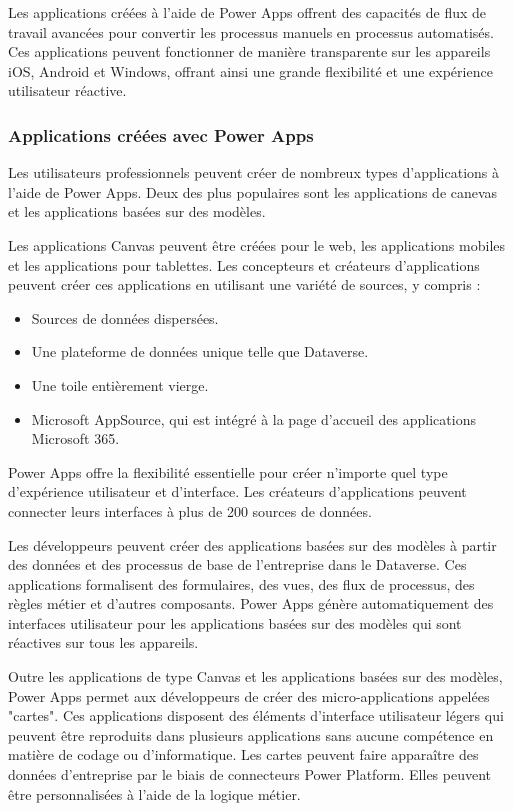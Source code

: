 \documentclass[a4paper, oneside, 12pt, final]{extreport}
\begin{document}
Les applications créées à l'aide de Power Apps offrent des capacités de flux de travail avancées pour convertir les processus manuels en processus automatisés. Ces applications peuvent fonctionner de manière transparente sur les appareils iOS, Android et Windows, offrant ainsi une grande flexibilité et une expérience utilisateur réactive.


\subsubsection{Applications créées avec Power Apps}
Les utilisateurs professionnels peuvent créer de nombreux types d'applications à l'aide de Power Apps. Deux des plus populaires sont les applications de canevas et les applications basées sur des modèles.

Les applications Canvas peuvent être créées pour le web, les applications mobiles et les applications pour tablettes. Les concepteurs et créateurs d'applications peuvent créer ces applications en utilisant une variété de sources, y compris :
\begin{itemize}
\item Sources de données dispersées.
\item Une plateforme de données unique telle que Dataverse.
\item Une toile entièrement vierge.
\item Microsoft AppSource, qui est intégré à la page d'accueil des applications Microsoft 365.
\end{itemize}

Power Apps offre la flexibilité essentielle pour créer n'importe quel type d'expérience utilisateur et d'interface. Les créateurs d'applications peuvent connecter leurs interfaces à plus de 200 sources de données.

Les développeurs peuvent créer des applications basées sur des modèles à partir des données et des processus de base de l'entreprise dans le Dataverse. Ces applications formalisent des formulaires, des vues, des flux de processus, des règles métier et d'autres composants. Power Apps génère automatiquement des interfaces utilisateur pour les applications basées sur des modèles qui sont réactives sur tous les appareils.

Outre les applications de type Canvas et les applications basées sur des modèles, Power Apps permet aux développeurs de créer des micro-applications appelées "cartes". Ces applications disposent des éléments d'interface utilisateur légers qui peuvent être reproduits dans plusieurs applications sans aucune compétence en matière de codage ou d'informatique. Les cartes peuvent faire apparaître des données d'entreprise par le biais de connecteurs Power Platform. Elles peuvent être personnalisées à l'aide de la logique métier.
\end{document}
